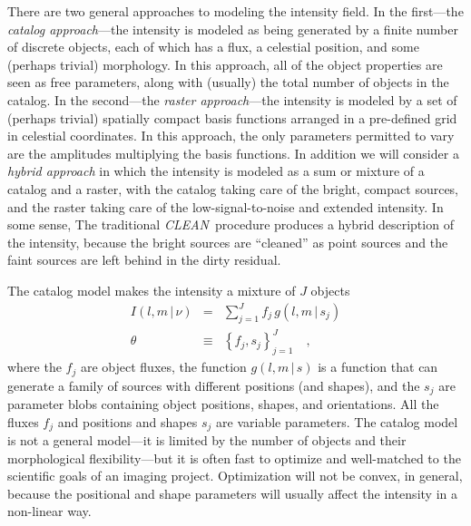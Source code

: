 \documentclass[12pt]{article}
\newcommand{\project}[1]{\textsl{#1}}
\newcommand{\CLEAN}{\project{CLEAN}}
\newcommand{\set}[1]{\left\{{#1}\right\}}
\newcommand{\given}{\,|\,}
\begin{document}
There are two general approaches to modeling the intensity field.  In
the first---the \emph{catalog approach}---the intensity is modeled as
being generated by a finite number of discrete objects, each of which
has a flux, a celestial position, and some (perhaps trivial)
morphology.  In this approach, all of the object properties are seen
as free parameters, along with (usually) the total number of objects
in the catalog.  In the second---the \emph{raster approach}---the
intensity is modeled by a set of (perhaps trivial) spatially compact
basis functions arranged in a pre-defined grid in celestial
coordinates.  In this approach, the only parameters permitted to vary
are the amplitudes multiplying the basis functions.  In addition we
will consider a \emph{hybrid approach} in which the intensity is
modeled as a sum or mixture of a catalog and a raster, with the
catalog taking care of the bright, compact sources, and the raster
taking care of the low-signal-to-noise and extended intensity.  In
some sense, The traditional \CLEAN\ procedure produces a hybrid
description of the intensity, because the bright sources are
``cleaned'' as point sources and the faint sources are left behind in
the dirty residual.

The catalog model makes the intensity a mixture of $J$ objects
\begin{eqnarray}
I(l,m\given\nu) &=& \sum_{j=1}^J f_j\,g(l,m\given s_j)
\\
\theta &\equiv& \set{f_j, s_j}_{j=1}^J
\quad,
\end{eqnarray}
where the $f_j$ are object fluxes, the function $g(l,m\given s)$ is a
function that can generate a family of sources with different
positions (and shapes), and the $s_j$ are parameter blobs containing
object positions, shapes, and orientations.  All the fluxes $f_j$ and
positions and shapes $s_j$ are variable parameters.  The catalog model
is not a general model---it is limited by the number of objects and
their morphological flexibility---but it is often fast to optimize and
well-matched to the scientific goals of an imaging project.
Optimization will not be convex, in general, because the positional
and shape parameters will usually affect the intensity in a non-linear
way.
\end{document}
